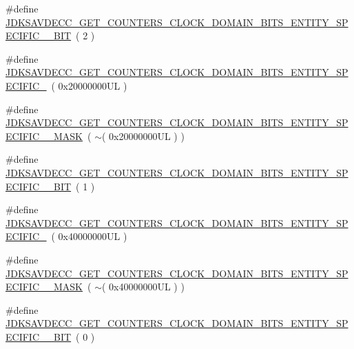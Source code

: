 \begin{DoxyCompactItemize}
\item 
\#define \hyperlink{group__get__counters__clock__domain__bits_ga9ad1d934e70baec268b2421516ee1815}{J\+D\+K\+S\+A\+V\+D\+E\+C\+C\+\_\+\+G\+E\+T\+\_\+\+C\+O\+U\+N\+T\+E\+R\+S\+\_\+\+C\+L\+O\+C\+K\+\_\+\+D\+O\+M\+A\+I\+N\+\_\+\+B\+I\+T\+S\+\_\+\+E\+N\+T\+I\+T\+Y\+\_\+\+S\+P\+E\+C\+I\+F\+I\+C\+\_\+\_\+\+B\+IT}~( 2 )
\item 
\#define \hyperlink{group__get__counters__clock__domain__bits_ga4cdb0da44776a86430b5109e4785593f}{J\+D\+K\+S\+A\+V\+D\+E\+C\+C\+\_\+\+G\+E\+T\+\_\+\+C\+O\+U\+N\+T\+E\+R\+S\+\_\+\+C\+L\+O\+C\+K\+\_\+\+D\+O\+M\+A\+I\+N\+\_\+\+B\+I\+T\+S\+\_\+\+E\+N\+T\+I\+T\+Y\+\_\+\+S\+P\+E\+C\+I\+F\+I\+C\+\_}~( 0x20000000\+U\+L )
\item 
\#define \hyperlink{group__get__counters__clock__domain__bits_gadf5bc21c9269dc67884850e8d681116a}{J\+D\+K\+S\+A\+V\+D\+E\+C\+C\+\_\+\+G\+E\+T\+\_\+\+C\+O\+U\+N\+T\+E\+R\+S\+\_\+\+C\+L\+O\+C\+K\+\_\+\+D\+O\+M\+A\+I\+N\+\_\+\+B\+I\+T\+S\+\_\+\+E\+N\+T\+I\+T\+Y\+\_\+\+S\+P\+E\+C\+I\+F\+I\+C\+\_\+\_\+\+M\+A\+SK}~( $\sim$( 0x20000000\+U\+L ) )
\item 
\#define \hyperlink{group__get__counters__clock__domain__bits_gaec94fb97f1cb560ef8a6ee7a5526a7ae}{J\+D\+K\+S\+A\+V\+D\+E\+C\+C\+\_\+\+G\+E\+T\+\_\+\+C\+O\+U\+N\+T\+E\+R\+S\+\_\+\+C\+L\+O\+C\+K\+\_\+\+D\+O\+M\+A\+I\+N\+\_\+\+B\+I\+T\+S\+\_\+\+E\+N\+T\+I\+T\+Y\+\_\+\+S\+P\+E\+C\+I\+F\+I\+C\+\_\+\_\+\+B\+IT}~( 1 )
\item 
\#define \hyperlink{group__get__counters__clock__domain__bits_ga0767ac8774bac904a2be5ad05ee28f11}{J\+D\+K\+S\+A\+V\+D\+E\+C\+C\+\_\+\+G\+E\+T\+\_\+\+C\+O\+U\+N\+T\+E\+R\+S\+\_\+\+C\+L\+O\+C\+K\+\_\+\+D\+O\+M\+A\+I\+N\+\_\+\+B\+I\+T\+S\+\_\+\+E\+N\+T\+I\+T\+Y\+\_\+\+S\+P\+E\+C\+I\+F\+I\+C\+\_}~( 0x40000000\+U\+L )
\item 
\#define \hyperlink{group__get__counters__clock__domain__bits_ga04577aea7879d0dbc995d526fb99701b}{J\+D\+K\+S\+A\+V\+D\+E\+C\+C\+\_\+\+G\+E\+T\+\_\+\+C\+O\+U\+N\+T\+E\+R\+S\+\_\+\+C\+L\+O\+C\+K\+\_\+\+D\+O\+M\+A\+I\+N\+\_\+\+B\+I\+T\+S\+\_\+\+E\+N\+T\+I\+T\+Y\+\_\+\+S\+P\+E\+C\+I\+F\+I\+C\+\_\+\_\+\+M\+A\+SK}~( $\sim$( 0x40000000\+U\+L ) )
\item 
\#define \hyperlink{group__get__counters__clock__domain__bits_ga2fe731fba3e755d2de33c402cb6ca08e}{J\+D\+K\+S\+A\+V\+D\+E\+C\+C\+\_\+\+G\+E\+T\+\_\+\+C\+O\+U\+N\+T\+E\+R\+S\+\_\+\+C\+L\+O\+C\+K\+\_\+\+D\+O\+M\+A\+I\+N\+\_\+\+B\+I\+T\+S\+\_\+\+E\+N\+T\+I\+T\+Y\+\_\+\+S\+P\+E\+C\+I\+F\+I\+C\+\_\+\_\+\+B\+IT}~( 0 )

\end{DoxyCompactItemize}
